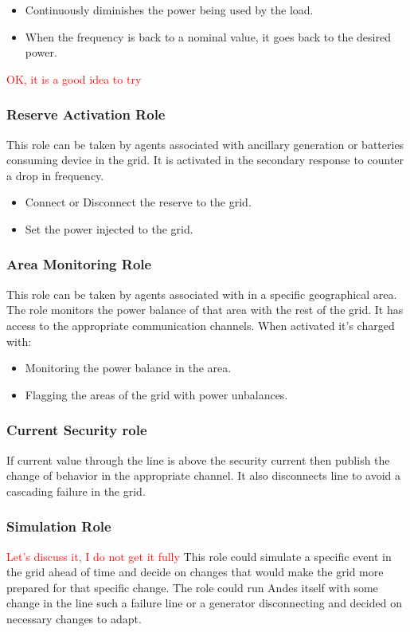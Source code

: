 \documentclass{article}
\begin{document}
\begin{itemize}
    \item Continuously diminishes the power being used by the load.
    \item When the frequency is back to a nominal value, it goes back to the desired power.
\end{itemize}
\textcolor{red}{OK, it is a good idea to try}

\subsubsection*{Reserve Activation Role}

This role can be taken by agents associated with ancillary generation or batteries consuming device in the grid. It is activated in the secondary response to counter a drop in frequency.

\begin{itemize}
    \item Connect or Disconnect the reserve to the grid.
    \item Set the power injected to the grid.
\end{itemize}

\subsubsection*{Area Monitoring Role}

This role can be taken by agents associated with in a specific geographical area. The role monitors the power balance of that area with the rest of the grid. It has access to the appropriate communication channels. When activated it's charged with:
\begin{itemize}
    \item Monitoring the power balance in the area. 
    \item Flagging the areas of the grid with power unbalances.
\end{itemize}

\subsubsection*{Current Security role}
If current value through the line is above the security current then publish the change of behavior in the appropriate channel. It also disconnects line to avoid a cascading failure in the grid.

\subsubsection*{Simulation Role}
\textcolor{red}{Let's discuss it, I do not get it fully}
This role could simulate a specific event in the grid ahead of time and decide on changes that would make the grid more prepared for that specific change. The role could run Andes itself with some change in the line such a failure line or a generator disconnecting and decided on necessary changes to adapt.
\end{document}

